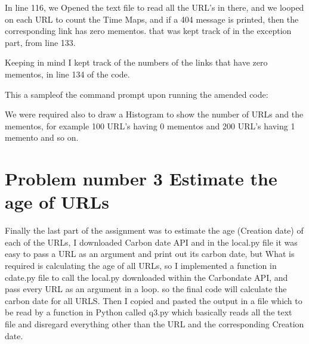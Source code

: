 \documentclass{article}
\begin{document}
In line 116, we Opened the text file to read all the URL's in there, and we looped on each URL to count the Time Maps, and if a 404 message is printed, then the corresponding link has zero mementos. that was kept track of in the exception part, from line 133.

Keeping in mind I kept track of the numbers of the links that have zero mementos, in line 134 of the code.

This a sampleof the command prompt upon running the amended code:


We were required also to draw a Histogram to show the number of URLs and the mementos, for example 100 URL's having 0 mementos and 200 URL's having 1 memento and so on.
\newpage
\section{Problem number 3 Estimate the age of URLs}

Finally the last part of the assignment was to estimate the age (Creation date) of each of the URLs, I downloaded Carbon date API and in the local.py file it was easy to pass a URL as an argument and print out its carbon date, but What is required is calculating the age of all URLs, so I implemented a function in cdate.py file to call the local.py downloaded within the Carbondate API, and pass every URL as an argument in a loop. so the final code will calculate the carbon date for all URLS. Then I copied and pasted the output in a file which to be read by a function in Python called q3.py which basically reads all the text file and disregard everything other than the URL and the corresponding Creation date.
\newpage

\end{document}
